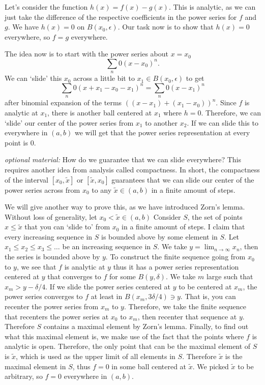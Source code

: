     Let's consider the function $h(x)=f(x)-g(x)$. This is analytic, as we can just take the difference of the respective coefficients in the power series for $f$ and $g$. We have $h(x)=0$ on $B(x_0,\epsilon)$. Our task now is to show that $h(x)=0$ everywhere, so $f=g$ everywhere.

    The idea now is to start with the power series about $x=x_0$ \[
    \sum_{n} 0 (x-x_0)^n.
    \]
    We can `slide' this $x_0$ across a little bit to $x_1\in B(x_0,\epsilon)$ to get \[
        \sum_{n} 0 (x+x_1-x_0-x_1)^n =\sum_{n} 0 (x-x_1)^n 
    \]
    after binomial expansion of the terms $((x-x_1)+(x_1-x_0))^n$. Since $f$ is analytic at $x_1$, there is another ball centered at $x_1$ where $h=0$. Therefore, we can `slide' our center of the power series from $x_1$ to another $x_2$. If we can slide this to everywhere in $(a,b)$ we will get that the power series representation at every point is $0$. 

    \textit{optional material:} How do we guarantee that we can slide everywhere? This requires another idea from analysis called compactness. In short, the compactness of the interval $[x_0,\tilde{x}]$ or $[\tilde{x},x_0]$ guarantees that we can slide our center of the power series across from $x_0$ to any $\tilde{x}\in (a,b)$ in a finite amount of steps. 

    We will give another way to prove this, as we have introduced Zorn's lemma. Without loss of generality, let $x_0<\tilde{x}\in (a,b)$ Consider $S$, the set of points $x\leq \tilde{x}$ that you can `slide to' from $x_0$ in a finite amount of steps. I claim that every increasing sequence in $S$ is bounded above by some element in $S$.
    Let $x_1\leq x_2\leq x_3 \leq \ldots$ be an increasing sequence in $S$. We take $y=\lim_{n\to\infty} x_n$, then the series is bounded above by $y$. To construct the finite sequence going from $x_0$ to $y$, we see that $f$ is analytic at $y$ thus it has a power series representation centered at $y$ that converges to $f$ for some $B(y,\delta)$. We take $m$ large such that $x_m>y-\delta/4$. If we slide the power series centered at $y$ to be centered at $x_m$, the power series converges to $f$ at least in $B(x_m,3\delta/4)\ni y$. That is, you can recenter the power series from $x_m$ to $y$. Therefore, we take the finite sequence that recenters the power series at $x_0$ to $x_m$, then recenter that sequence at $y$. Therefore $S$ contains a maximal element by Zorn's lemma. Finally, to find out what this maximal element is, we make use of the fact that the points where $f$ is analytic is open. Therefore, the only point that can be the maximal element of $S$ is $\tilde{x}$, which is used as the upper limit of all elements in $S$. Therefore $\tilde{x}$ is the maximal element in $S$, thus $f=0$ in some ball centered at $\tilde{x}$. We picked $\tilde{x}$ to be arbitrary, so $f=0$ everywhere in $(a,b)$.

